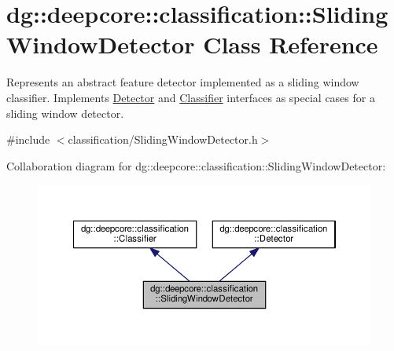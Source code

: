 \hypertarget{classdg_1_1deepcore_1_1classification_1_1_sliding_window_detector}{}\section{dg\+:\+:deepcore\+:\+:classification\+:\+:Sliding\+Window\+Detector Class Reference}
\label{classdg_1_1deepcore_1_1classification_1_1_sliding_window_detector}


Represents an abstract feature detector implemented as a sliding window classifier. Implements \hyperlink{classdg_1_1deepcore_1_1classification_1_1_detector}{Detector} and \hyperlink{classdg_1_1deepcore_1_1classification_1_1_classifier}{Classifier} interfaces as special cases for a sliding window detector.  




{\ttfamily \#include $<$classification/\+Sliding\+Window\+Detector.\+h$>$}



Collaboration diagram for dg\+:\+:deepcore\+:\+:classification\+:\+:Sliding\+Window\+Detector\+:
\nopagebreak
\begin{figure}[H]
\begin{center}
\leavevmode
\includegraphics[width=350pt]{classdg_1_1deepcore_1_1classification_1_1_sliding_window_detector__coll__graph}
\end{center}
\end{figure}
